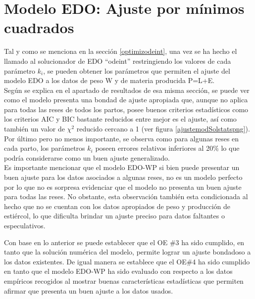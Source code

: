 \section{Modelo EDO: Ajuste por mínimos cuadrados}

Tal y como se menciona en la sección \ref{optimizodeint}, una vez se ha hecho el llamado al solucionador de EDO ``odeint'' restringiendo los valores de cada parámetro $k_{i}$, se pueden obtener los parámetros que permiten el ajuste del modelo EDO a los datos de peso W y de materia producida P=L+E. \\

Según se explica en el apartado de resultados de esa misma sección, se puede ver como el modelo presenta una bondad de ajuste apropiada que, aunque no aplica para todas las reses de todos los partos, posee buenos criterios estadísticos como los criterios AIC y BIC bastante reducidos entre mejor es el ajuste, así como también un valor de $\chi^{2}$ reducido cercano a 1 (ver figura \ref{ajustemodSolstatspng}). Por último pero no menos importante, se observa como para algunas reses en cada parto, los parámetros $k_{i}$ poseen errores relativos inferiores al 20\% lo que podría considerarse como un buen ajuste generalizado. \\

Es importante mencionar que el modelo EDO-WP si bien puede presentar un buen ajuste para los datos asociados a algunas reses, no es un modelo perfecto por lo que no es sorpresa evidenciar que el modelo no presenta un buen ajuste para todas las reses. No obstante, esta observación también esta condicionada al hecho que no se cuentan con los datos apropiados de peso y producción de estiércol, lo que dificulta brindar un ajuste preciso para datos faltantes o especulativos.

Con base en lo anterior se puede establecer que el OE \#3 ha sido cumplido, en tanto que la solución numérica del modelo, permite lograr un ajuste bondadoso a los datos existentes. De igual manera se establece que el OE\#4 ha sido cumplido en tanto que el modelo EDO-WP ha sido evaluado con respecto a los datos empíricos recogidos al mostrar buenas características estadísticas que permiten afirmar que presenta un buen ajuste a los datos usados.



